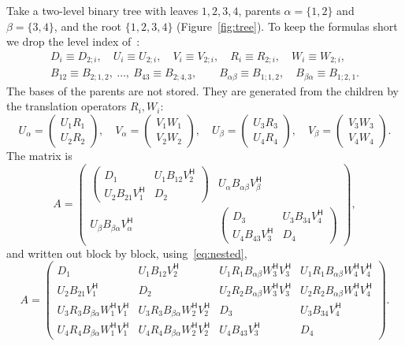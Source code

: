 \documentclass[11pt]{article}
\newcommand{\ct}{^{\mathsf H}}            %
\theoremstyle{definition}
\begin{document}
Take a two-level binary tree with leaves $1,2,3,4$, parents $\alpha=\{1,2\}$
and $\beta=\{3,4\}$, and the root $\{1,2,3,4\}$ (Figure~\ref{fig:tree}). To keep
the formulas short we drop the level index of~\cite{CGP06}:
\begin{gather*}
D_i \equiv D_{2;i},\quad U_i\equiv U_{2;i},\quad V_i\equiv V_{2;i},\quad
R_i\equiv R_{2;i},\quad W_i\equiv W_{2;i},\\
B_{12}\equiv B_{2;1,2},\ \dots,\ B_{43}\equiv B_{2;4,3},\qquad B_{\alpha\beta}\equiv B_{1;1,2},\quad B_{\beta\alpha}\equiv B_{1;2,1}.
\end{gather*}
The bases of the parents are not stored. They are generated from the
children by the translation operators $R_i, W_i$:
\begin{equation}
\label{eq:nested}
U_\alpha = \begin{pmatrix} U_1R_1\\ U_2R_2\end{pmatrix},\quad
V_\alpha = \begin{pmatrix} V_1W_1\\ V_2W_2\end{pmatrix},\quad
U_\beta = \begin{pmatrix} U_3R_3\\ U_4R_4\end{pmatrix},\quad
V_\beta = \begin{pmatrix} V_3W_3\\ V_4W_4\end{pmatrix}.
\end{equation}
The matrix is
\[
A=\left(\begin{array}{c|c}
\begin{pmatrix} D_1 & U_1B_{12}V_2\ct\\ U_2B_{21}V_1\ct & D_2\end{pmatrix} &
U_\alpha B_{\alpha\beta}V_\beta\ct\\[12pt]\hline
U_\beta B_{\beta\alpha}V_\alpha\ct &
\begin{pmatrix} D_3 & U_3B_{34}V_4\ct\\ U_4B_{43}V_3\ct & D_4\end{pmatrix}
\end{array}\right),
\]
and written out block by block, using~\eqref{eq:nested},
\begin{equation}
\label{eq:hss}
A=
\left(\begin{array}{c|c|c|c}
D_1 & U_1B_{12}V_2\ct & U_1R_1B_{\alpha\beta}W_3\ct V_3\ct & U_1R_1B_{\alpha\beta}W_4\ct V_4\ct\\[2pt]\hline
U_2B_{21}V_1\ct & D_2 & U_2R_2B_{\alpha\beta}W_3\ct V_3\ct & U_2R_2B_{\alpha\beta}W_4\ct V_4\ct\\[2pt]\hline
U_3R_3B_{\beta\alpha}W_1\ct V_1\ct & U_3R_3B_{\beta\alpha}W_2\ct V_2\ct & D_3 & U_3B_{34}V_4\ct\\[2pt]\hline
U_4R_4B_{\beta\alpha}W_1\ct V_1\ct & U_4R_4B_{\beta\alpha}W_2\ct V_2\ct & U_4B_{43}V_3\ct & D_4
\end{array}\right).
\end{equation}
\end{document}
